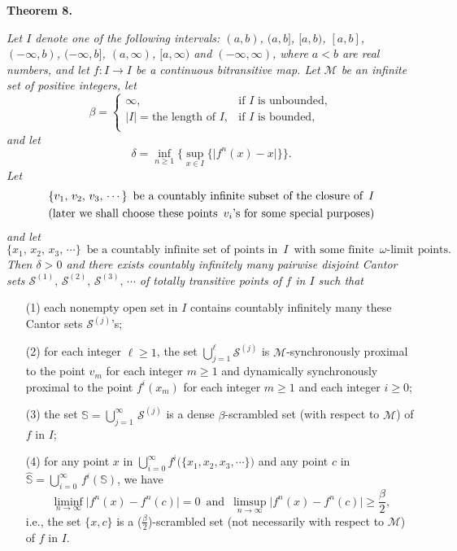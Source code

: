 \documentclass[12pt]{article}
\begin{document}
\noindent
{\bf Theorem 8.}
{\it Let $I$ denote one of the following intervals: $(a, b)$, $(a, b]$, $[a, b)$, $[a, b]$, $(-\infty, b)$, $(-\infty, b]$, $(a, \infty)$, $[a, \infty)$ and $(-\infty, \infty)$, where $a < b$ are real numbers, and let $f : I \rightarrow I$ be a continuous bitransitive map.  Let $\mathcal M$ be an infinite set of positive integers, let
$$
\beta =  \begin{cases}
               \infty, & \text{if $I$ is unbounded}, \\
               |I| = \text{the length of $I$}, & \text{if $I$ is bounded}, \\
       \end{cases}
$$
and let 
$$\delta = \inf_{n \ge 1} \bigg\{ \sup_{x \in I} \big\{ \big|f^n(x) - x\big| \big\} \bigg\}.$$ 
Let 
\begin{multline*}
$$
\{ v_1, \, v_2, \, v_3, \, \cdots \} \,\,\, \text{be a countably infinite subset of the closure of} \,\,\, I \\ \text{(later we shall choose these points} \,\,\, v_i\text{'s for some special purposes)}
$$
\end{multline*} 
and let
$$
\{ x_1, \, x_2, \, x_3, \, \cdots \} \,\,\, \text{be a countably infinite set of points in} \,\,\, I \,\,\, \text{with some finite} \,\,\, \omega\text{-limit points}
.$$  
Then $\delta > 0$ and there exists countably infinitely many pairwise disjoint Cantor sets $\mathcal S^{(1)}, \, \mathcal S^{(2)}, \, \mathcal S^{(3)}, \, \cdots$ of totally transitive points of $f$ in $I$ such that 
\begin{itemize}
\item[{\rm (1)}]
each nonempty open set in $I$ contains countably infinitely many these Cantor sets $\mathcal S^{(j)}$'s;

\item[{\rm (2)}]
for each integer $\ell \ge 1$, the set $\bigcup_{j=1}^\ell \mathcal S^{(j)}$ is $\mathcal M$-synchronously proximal to the point $v_m$ for each integer $m \ge 1$ and dynamically synchronously proximal to the point $f^i(x_m)$ for each integer $m \ge 1$ and each integer $i \ge 0$;

\item[{\rm (3)}]
the set $\mathbb S = \bigcup_{j=1}^\infty \, \mathcal S^{(j)}$ is a dense $\beta$-scrambled set (with respect to $\mathcal M$) of $f$ in $I$;

\item[{\rm (4)}]
for any point $x$ in $\bigcup_{i=0}^\infty f^i\big(\{x_1, x_2, x_3, \cdots\}\big)$ and any point $c$ in $\widehat {\mathbb S} = \bigcup_{i=0}^\infty \, f^i(\mathbb S)$, 
we have $$\liminf_{n \to \infty} \big|f^n(x) - f^n(c)\big| = 0 \,\,\, \text{and} \,\,\, \limsup_{n \to \infty} \big|f^n(x) - f^n(c)\big| \ge \frac \beta2,$$i.e., the set $\{ x, c \}$ is a ($\frac {\beta}2$)-scrambled set (not necessarily with respect to $\mathcal M$) of $f$ in $I$.


\end{itemize}}
\end{document}
